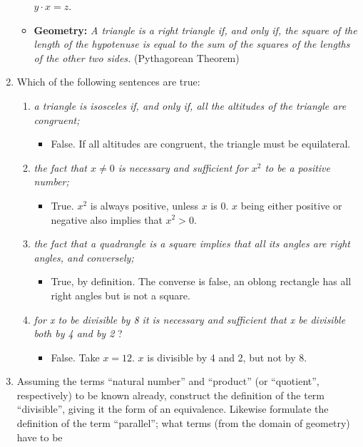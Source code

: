 \begin{enumerate}
\begin{itemize}
    $y{\cdot}x=z$. 
  \item \textbf{Geometry:} \emph{A triangle is a right triangle if,
      and only if, the square of the length of the hypotenuse is equal
      to the sum of the squares of the lengths of the other two
      sides.} (Pythagorean Theorem)
  \end{itemize}
\item Which of the following sentences are true:
  \begin{enumerate}
  \item \emph{a triangle is isosceles if, and only if, all the
      altitudes of the triangle are congruent;}
    \begin{itemize}
    \item False.  If all altitudes are congruent, the triangle must be
      equilateral.
    \end{itemize}
  \item \emph{the fact that $x \neq 0$ is necessary and sufficient for
      $x^2$ to be a positive number;}
    \begin{itemize}
    \item True.  $x^2$ is always positive, unless $x$ is 0.  $x$ being
      either positive or negative also implies that $x^2 > 0$.
    \end{itemize}
  \item \emph{the fact that a quadrangle is a square implies that all
      its angles are right angles, and conversely;}
    \begin{itemize}
    \item True, by definition.  The converse is false, an oblong
      rectangle has all right angles but is not a square.
    \end{itemize}
  \item \emph{for x to be divisible by 8 it is necessary and
      sufficient that x be divisible both by 4 and by 2} \quad ?
    \begin{itemize}
    \item False.  Take $x=12$.  $x$ is divisible by 4 and 2, but
      not by 8.
    \end{itemize}
  \end{enumerate}
\item Assuming the terms ``natural number'' and ``product'' (or
  ``quotient'', respectively) to be known already, construct the
  definition of the term ``divisible'', giving it the form of an
  equivalence.  Likewise formulate the definition of the term
  ``parallel''; what terms (from the domain of geometry) have to be

\end{enumerate}
